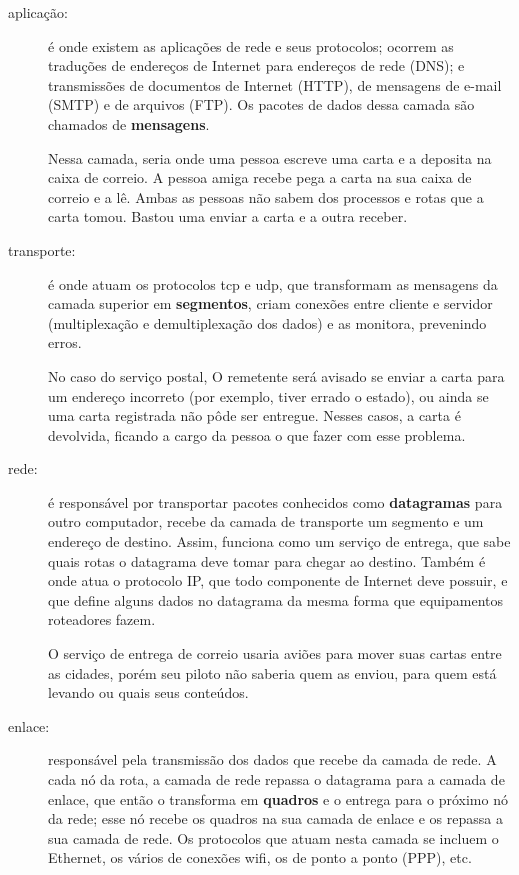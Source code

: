 \begin{description}
    \item[aplicação:] é onde existem as aplicações de rede e seus protocolos; ocorrem
        as traduções de endereços de Internet para endereços de rede (DNS); e
        transmissões de documentos de Internet (HTTP), de mensagens de e-mail (SMTP) e
        de arquivos (FTP). Os pacotes de dados dessa camada são chamados de
        \textbf{mensagens}.

        Nessa camada, seria onde uma pessoa escreve uma carta e a deposita na caixa de
        correio. A pessoa amiga recebe pega a carta na sua caixa de correio e a lê.
        Ambas as pessoas não sabem dos processos e rotas que a carta tomou. Bastou uma
        enviar a carta e a outra receber.

    \item[transporte:] é onde atuam os protocolos \gls{tcp} e \gls{udp}, que
        transformam as mensagens da camada superior em \textbf{segmentos}, criam
        conexões entre cliente e servidor (multiplexação e demultiplexação dos dados)
        e as monitora, prevenindo erros.

        No caso do serviço postal, O remetente será avisado se enviar a carta para um
        endereço incorreto (por exemplo, tiver errado o estado), ou ainda se uma carta
        registrada não pôde ser entregue. Nesses casos, a carta é devolvida, ficando a
        cargo da pessoa o que fazer com esse problema.

    \item[rede:] é responsável por transportar pacotes conhecidos como
        \textbf{datagramas} para outro computador, recebe da camada de transporte um
        segmento e um endereço de destino. Assim, funciona como um serviço de entrega,
        que sabe quais rotas o datagrama deve tomar para chegar ao destino. Também é
        onde atua o protocolo IP, que todo componente de Internet deve possuir, e que
        define alguns dados no datagrama da mesma forma que equipamentos roteadores
        fazem.

        O serviço de entrega de correio usaria aviões para mover suas cartas entre as
        cidades, porém seu piloto não saberia quem as enviou, para quem está levando ou
        quais seus conteúdos.

    \item[enlace:] responsável pela transmissão dos dados que recebe da camada de rede.
        A cada nó da rota, a camada de rede repassa o datagrama para a camada de
        enlace, que então o transforma em \textbf{quadros} e o entrega para o próximo
        nó da rede; esse nó recebe os quadros na sua camada de enlace e os repassa a
        sua camada de rede. Os protocolos que atuam nesta camada se incluem o Ethernet,
        os vários de conexões wifi, os de ponto a ponto (PPP), etc.


\end{description}
